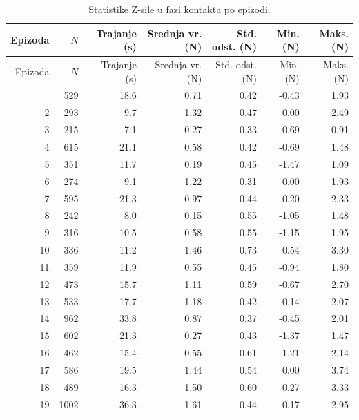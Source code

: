 \begin{longtable}{rrrrrrr}
  \caption{Statistike Z-sile u fazi kontakta po epizodi.}
  \label{tab:contact_forces} \\
  \toprule
  Epizoda & $N$ & Trajanje (s) & Srednja vr. (N) & Std. odst. (N) & Min. (N) & Maks. (N) \\
  \midrule
  \endfirsthead
  \toprule
  Epizoda & $N$ & Trajanje (s) & Srednja vr. (N) & Std. odst. (N) & Min. (N) & Maks. (N) \\
  \midrule
  \endhead
  \midrule
  \endfoot
  \bottomrule
  \endlastfoot
  1   &  529 &  18.6 &    0.71 &   0.42 &    -0.43 &    1.93 \\
  2   &  293 &   9.7 &    1.32 &   0.47 &     0.00 &    2.49 \\
  3   &  215 &   7.1 &    0.27 &   0.33 &    -0.69 &    0.91 \\
  4   &  615 &  21.1 &    0.58 &   0.42 &    -0.69 &    1.48 \\
  5   &  351 &  11.7 &    0.19 &   0.45 &    -1.47 &    1.09 \\
  6   &  274 &   9.1 &    1.22 &   0.31 &     0.00 &    1.93 \\
  7   &  595 &  21.3 &    0.97 &   0.44 &    -0.20 &    2.33 \\
  8   &  242 &   8.0 &    0.15 &   0.55 &    -1.05 &    1.48 \\
  9   &  316 &  10.5 &    0.58 &   0.55 &    -1.15 &    1.95 \\
  10  &  336 &  11.2 &    1.46 &   0.73 &    -0.54 &    3.30 \\
  11  &  359 &  11.9 &    0.55 &   0.45 &    -0.94 &    1.80 \\
  12  &  473 &  15.7 &    1.11 &   0.59 &    -0.67 &    2.70 \\
  13  &  533 &  17.7 &    1.18 &   0.42 &    -0.14 &    2.07 \\
  14  &  962 &  33.8 &    0.87 &   0.37 &    -0.45 &    2.01 \\
  15  &  602 &  21.3 &    0.27 &   0.43 &    -1.37 &    1.47 \\
  16  &  462 &  15.4 &    0.55 &   0.61 &    -1.21 &    2.14 \\
  17  &  586 &  19.5 &    1.44 &   0.54 &     0.00 &    3.74 \\
  18  &  489 &  16.3 &    1.50 &   0.60 &     0.27 &    3.33 \\
  19  & 1002 &  36.3 &    1.61 &   0.44 &     0.17 &    2.95 \\

\end{longtable}
